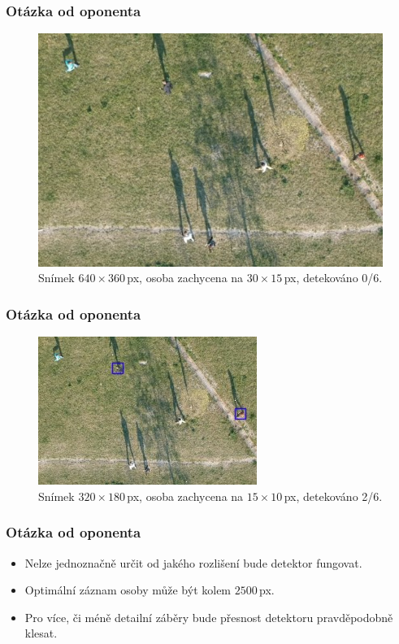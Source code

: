 \documentclass[11pt,xcolor=pdflatex]{beamer}
\begin{document}
\begin{frame}\frametitle{Otázka od oponenta}
    \begin{figure}[H]
        \centering
        \includegraphics[width=.9\linewidth]{images/oponent-50.jpg}
        \caption{Snímek $640 \times 360$\,px, osoba zachycena na $30 \times 15$\,px, detekováno 0/6.}
    \end{figure}                
\end{frame}

\begin{frame}\frametitle{Otázka od oponenta}
     \begin{figure}[H]
        \centering
        \includegraphics[width=.9\linewidth]{images/oponent-25.jpg}
        \caption{Snímek $320 \times 180$\,px, osoba zachycena na $15 \times 10$\,px, detekováno 2/6.}
    \end{figure} 
\end{frame}

\begin{frame}\frametitle{Otázka od oponenta}
    \begin{itemize}
        \item Nelze jednoznačně určit od jakého rozlišení bude detektor fungovat.
        \item Optimální záznam osoby může být kolem $2500$\,px.
            \item Pro více, či méně detailní záběry bude přesnost detektoru pravděpodobně klesat.
    \end{itemize}     
     
         
\end{frame}

\end{document}
